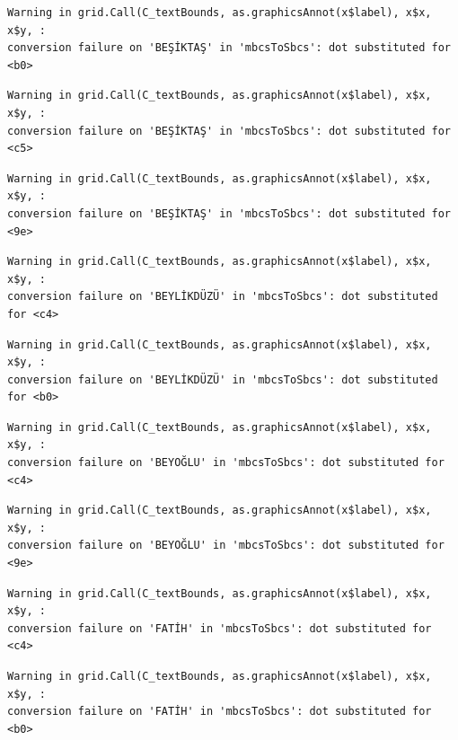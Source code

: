 \documentclass[
  11pt,
  a4paper,
  DIV=11,
  numbers=noendperiod]{scrartcl}
\begin{document}
\begin{verbatim}
Warning in grid.Call(C_textBounds, as.graphicsAnnot(x$label), x$x, x$y, :
conversion failure on 'BEŞİKTAŞ' in 'mbcsToSbcs': dot substituted for <b0>
\end{verbatim}

\begin{verbatim}
Warning in grid.Call(C_textBounds, as.graphicsAnnot(x$label), x$x, x$y, :
conversion failure on 'BEŞİKTAŞ' in 'mbcsToSbcs': dot substituted for <c5>
\end{verbatim}

\begin{verbatim}
Warning in grid.Call(C_textBounds, as.graphicsAnnot(x$label), x$x, x$y, :
conversion failure on 'BEŞİKTAŞ' in 'mbcsToSbcs': dot substituted for <9e>
\end{verbatim}

\begin{verbatim}
Warning in grid.Call(C_textBounds, as.graphicsAnnot(x$label), x$x, x$y, :
conversion failure on 'BEYLİKDÜZÜ' in 'mbcsToSbcs': dot substituted for <c4>
\end{verbatim}

\begin{verbatim}
Warning in grid.Call(C_textBounds, as.graphicsAnnot(x$label), x$x, x$y, :
conversion failure on 'BEYLİKDÜZÜ' in 'mbcsToSbcs': dot substituted for <b0>
\end{verbatim}

\begin{verbatim}
Warning in grid.Call(C_textBounds, as.graphicsAnnot(x$label), x$x, x$y, :
conversion failure on 'BEYOĞLU' in 'mbcsToSbcs': dot substituted for <c4>
\end{verbatim}

\begin{verbatim}
Warning in grid.Call(C_textBounds, as.graphicsAnnot(x$label), x$x, x$y, :
conversion failure on 'BEYOĞLU' in 'mbcsToSbcs': dot substituted for <9e>
\end{verbatim}

\begin{verbatim}
Warning in grid.Call(C_textBounds, as.graphicsAnnot(x$label), x$x, x$y, :
conversion failure on 'FATİH' in 'mbcsToSbcs': dot substituted for <c4>
\end{verbatim}

\begin{verbatim}
Warning in grid.Call(C_textBounds, as.graphicsAnnot(x$label), x$x, x$y, :
conversion failure on 'FATİH' in 'mbcsToSbcs': dot substituted for <b0>
\end{verbatim}
\end{document}
